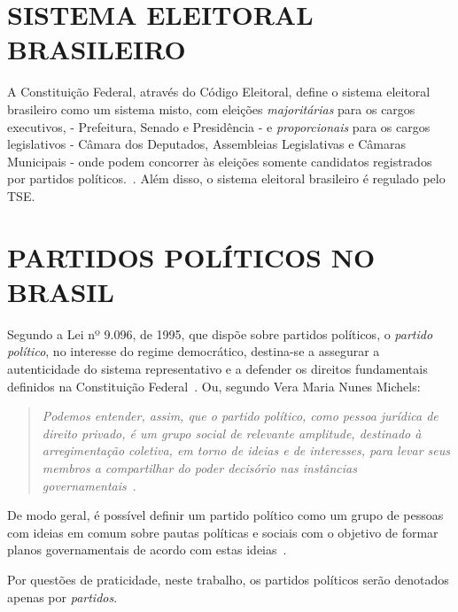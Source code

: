 \section{\texorpdfstring{\MakeUppercase{Sistema Eleitoral Brasileiro}}{}}

A Constituição Federal, através do Código Eleitoral, define o sistema eleitoral brasileiro como um sistema misto, com eleições \emph{majoritárias} para os cargos executivos, - Prefeitura, Senado e Presidência - e \emph{proporcionais} para os cargos legislativos - Câmara dos Deputados, Assembleias Legislativas e Câmaras Municipais - onde podem concorrer às eleições somente candidatos registrados por partidos políticos.~\cite{brasil1965lei4737}. Além disso, o sistema eleitoral brasileiro é regulado pelo \gls{TSE}.

\section{\texorpdfstring{\MakeUppercase{Partidos Políticos no Brasil}}{}}
\label{conceitos__partidos-brasil}

Segundo a  Lei nº 9.096, de 1995, que dispõe sobre partidos políticos, o \emph{partido político}, no interesse do regime democrático, destina-se a assegurar a autenticidade do sistema representativo e a defender os direitos fundamentais definidos na Constituição Federal~\cite{brasil1995lei9096}. Ou, segundo Vera Maria Nunes Michels:

\begin{quotation}
    \emph{Podemos entender, assim, que o partido político, como pessoa jurídica de direito privado, é um grupo social de relevante amplitude, destinado à arregimentação coletiva, em torno de ideias e de interesses, para levar seus membros a compartilhar do poder decisório nas instâncias governamentais}~\cite{michels2006direito}.
\end{quotation}

De modo geral, é possível definir um partido político como um grupo de pessoas com ideias em comum sobre pautas políticas e sociais com o objetivo de formar planos governamentais de acordo com estas ideias~\cite{garibaldi2017partidos}.

Por questões de praticidade, neste trabalho, os partidos políticos serão denotados apenas por \emph{partidos}.


